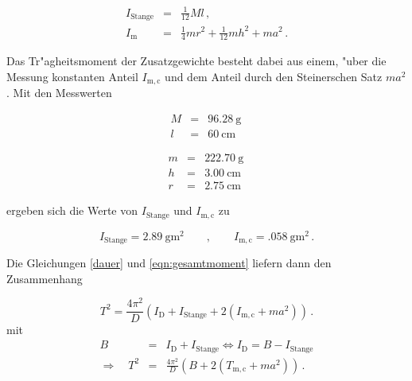 		\begin{eqnarray*}
			I_\mathrm{Stange} & = & \frac{1}{12} M l \,, \\
			I_\mathrm{m} & = & \frac{1}{4}mr^2 + \frac{1}{12}mh^2 + ma^2 \,.
		\end{eqnarray*}

		Das Tr"agheitsmoment der Zusatzgewichte besteht dabei aus einem, "uber die Messung konstanten Anteil $I_\mathrm{m,c}$ und dem Anteil durch den Steinerschen Satz $ma^2$.
		Mit den Messwerten
		
		\begin{figure}[h!]
			\begin{minipage}[t]{7cm}
				\begin{eqnarray*}
					M & = & \SI{96.28}{\gram} \, \\
					l & = & \SI{60}{\centi \meter} \,
				\end{eqnarray*}
			\end{minipage}
			\hfill
			\begin{minipage}[t]{7cm}
				\begin{eqnarray*}
					m & = & \SI{222.70}{\gram} \, \\
					h & = & \SI{3.00}{\centi \meter} \, \\
					r & = & \SI{2.75}{\centi \meter} \,
				\end{eqnarray*}
			\end{minipage}
		\end{figure}

		ergeben sich die Werte von $I_\mathrm{Stange}$ und $I_\mathrm{m,c}$ zu

		\begin{equation*}
			I_\mathrm{Stange} = \SI{2.89}{\gram \meter \squared} \qquad , \qquad I_\mathrm{m,c} = \SI{.058}{\gram \meter \squared} \,.
		\end{equation*}

		Die Gleichungen \eqref{dauer} und \eqref{eqn:gesamtmoment} liefern dann den Zusammenhang

		\begin{equation*}
			T^2 = \frac{4 \pi^2}{D} \left(I_\mathrm{D} + I_\mathrm{Stange} + 2\left(I_\mathrm{m,c} + ma^2 \right)\right) \,.
		\end{equation*}
		mit
		\begin{eqnarray*}
			B & = & I_\mathrm{D} + I_\mathrm{Stange} \Leftrightarrow I_\mathrm{D} = B - I_\mathrm{Stange} \\
			\Rightarrow \quad T^2 & = & \frac{4\pi^2}{D}\left(B + 2\left(T_\mathrm{m,c} + ma^2\right)\right) \,.
		\end{eqnarray*}

